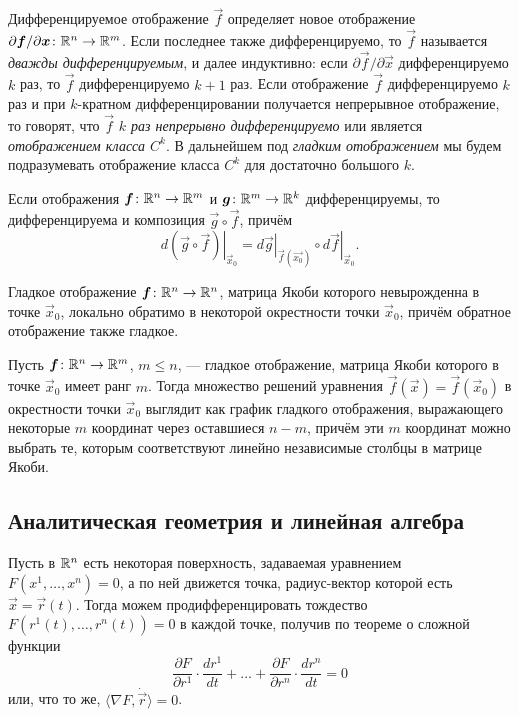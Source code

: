 Дифференцируемое отображение $\vec{f}$ определяет новое отображение $\partial \boldsymbol{f} / \partial \boldsymbol{x}\colon \mathbb{R}^n \to \mathbb{R}^m$. Если последнее также дифференцируемо, то $\vec{f}$ называется \textit{дважды дифференцируемым}, и далее индуктивно: если $\partial\vec{f} / \partial\vec{x}$ дифференцируемо $k$ раз, то $\vec{f}$ дифференцируемо $k + 1$ раз. Если отображение $\vec{f}$ дифференцируемо $k$ раз и при $k$-кратном дифференцировании получается непрерывное отображение, то говорят, что $\vec{f}$ \textit{$k$ раз непрерывно дифференцируемо} или является \textit{отображением класса $C^k$}. В дальнейшем под \textit{гладким отображением} мы будем подразумевать отображение класса $C^k$ для достаточно большого $k$.

\begin{theorem}
	Если отображения $\boldsymbol{f}\colon \mathbb{R}^n \to \mathbb{R}^m$ и $\boldsymbol{g}\colon \mathbb{R}^m \to \mathbb{R}^k$ дифференцируемы, то дифференцируема и композиция $\vec{g} \circ \vec{f}$, причём
	\[
		\left.d(\vec{g} \circ \vec{f})\right|_{\vec{x}_0} = \left.d\vec{g}\right|_{\vec{f}(\vec{x_0})} \circ \left.d\vec{f}\right|_{\vec{x}_0}.
	\]
\end{theorem}

\begin{theorem}
	Гладкое отображение $\boldsymbol{f}\colon \mathbb{R}^n \to \mathbb{R}^n$, матрица Якоби которого невырожденна в точке $\vec{x}_0$, локально обратимо в некоторой окрестности точки $\vec{x}_0$, причём обратное отображение также гладкое.
\end{theorem}

\begin{theorem}
	Пусть $\boldsymbol{f}\colon \mathbb{R}^n \to \mathbb{R}^m$, $m \leqslant n$, --- гладкое отображение, матрица Якоби которого в точке $\vec{x}_0$ имеет ранг $m$. Тогда множество решений уравнения $\vec{f}(\vec{x}) = \vec{f}(\vec{x}_0)$ в окрестности точки $\vec{x}_0$ выглядит как график гладкого отображения, выражающего некоторые $m$ координат через оставшиеся $n - m$, причём эти $m$ координат можно выбрать те, которым соответствуют линейно независимые столбцы в матрице Якоби.
\end{theorem}

\subsection{Аналитическая геометрия и линейная алгебра}

Пусть в $\mathbb{R}^n$ есть некоторая поверхность, задаваемая уравнением $F(x^1, \ldots, x^n) = 0$, а по ней движется точка, радиус-вектор которой есть $\vec{x} = \vec{r}(t)$. Тогда можем продифференцировать тождество $F(r^1(t), \ldots, r^n(t)) = 0$ в каждой точке, получив по теореме о сложной функции
\[
	\frac{\partial F}{\partial r^1} \cdot \frac{d r^1}{dt} + \ldots + \frac{\partial F}{\partial r^n} \cdot \frac{d r^n}{dt} = 0
\]
или, что то же, $\langle \nabla F, \dot{\vec{r}} \rangle = 0$.

